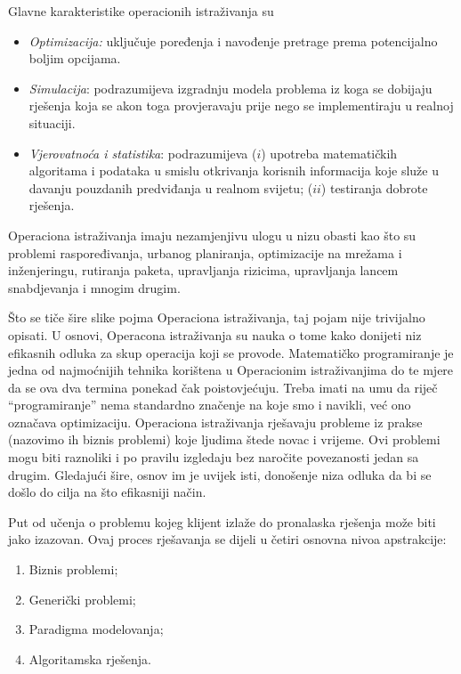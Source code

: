 \documentclass[a4paper, utf8, 11pt, colorlinks]{book}
\begin{document}
Glavne karakteristike operacionih istraživanja su
\begin{itemize}
    \item \emph{Optimizacija:} %
     uključuje poređenja i navođenje pretrage prema potencijalno boljim opcijama.
    \item \emph{Simulacija}:  podrazumijeva izgradnju modela problema iz koga se dobijaju rješenja koja se akon toga provjeravaju prije nego se implementiraju u realnoj situaciji.
    \item \emph{Vjerovatnoća i statistika}:  podrazumijeva ($i$) upotreba matematičkih algoritama i podataka u smislu otkrivanja korisnih informacija koje služe u davanju pouzdanih predviđanja u realnom svijetu; ($ii$) testiranja dobrote rješenja.
\end{itemize}
 
 Operaciona istraživanja imaju nezamjenjivu ulogu u nizu obasti kao što su problemi raspoređivanja, urbanog planiranja, optimizacije na mrežama i inženjeringu, rutiranja paketa, upravljanja rizicima, upravljanja lancem snabdjevanja i mnogim drugim. 

 Što se tiče   šire slike pojma Operaciona istraživanja, taj pojam nije trivijalno opisati. U osnovi, Operacona istraživanja su nauka o tome kako donijeti niz efikasnih odluka za skup operacija koji se provode. Matematičko programiranje je jedna od najmoćnijih tehnika 
 korištena u Operacionim istraživanjima do te mjere da  se   ova dva termina ponekad čak poistovjećuju. Treba imati na umu da riječ ``programiranje'' nema standardno značenje na koje smo i navikli, već ono označava optimizaciju. Operaciona istraživanja rješavaju probleme iz prakse (nazovimo ih biznis problemi) koje ljudima štede novac i vrijeme. Ovi problemi mogu biti raznoliki i po pravilu izgledaju bez naročite povezanosti jedan sa drugim. Gledajući šire, osnov  im je uvijek isti, donošenje niza odluka da bi se došlo do cilja na što efikasniji način.  %

  Put od učenja o problemu kojeg klijent izlaže do pronalaska rješenja može biti jako izazovan. Ovaj proces rješavanja se  dijeli u četiri osnovna nivoa apstrakcije:
  \begin{enumerate}
      \item Biznis problemi;
      \item Generički problemi; 
      \item Paradigma modelovanja;
      \item Algoritamska rješenja. 
  \end{enumerate}
  
\end{document}
